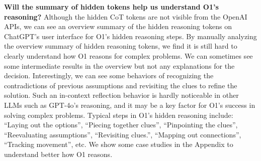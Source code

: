 \textbf{Will the summary of hidden tokens help us understand O1's reasoning?}
Although the hidden CoT tokens are not visible from the OpenAI APIs, we can see an overview summary of the hidden reasoning tokens on ChatGPT's user interface for O1's hidden reasoning steps.
By manually analyzing the overview summary of hidden reasoning tokens, we find it is still hard to clearly understand how O1 reasons for complex problems.
We can sometimes see some intermediate results in the overview but not any explanations for the decision.
Interestingly, we can see some behaviors of recognizing the contradictions of previous assumptions and revisiting the clues to refine the solution.
Such an in-context reflection behavior is hardly noticeable in other LLMs such as GPT-4o's reasoning, and it may be a key factor for O1's success in solving complex problems.
Typical steps in O1's hidden reasoning include: ``Laying out the options'', ``Piecing together clues'', ``Pinpointing the clues'', ``Reevaluating assumptions'', ``Revisiting clues.'', ``Mapping out connections'', ``Tracking movement'', etc.
We show some case studies in the Appendix to understand better how O1 reasons. 














 



